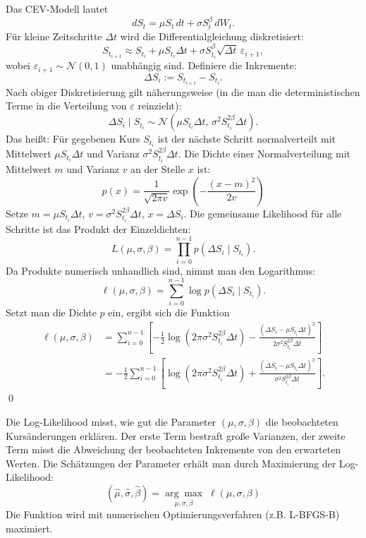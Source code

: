 \begin{satz}
Das CEV-Modell lautet
$$
dS_t = \mu S_t\,dt + \sigma S_t^{\beta}\,dW_t.
$$
Für kleine Zeitschritte $\Delta t$ wird die Differentialgleichung diskretisiert:
$$
S_{t_{i+1}} \approx S_{t_i} + \mu S_{t_i} \Delta t + \sigma S_{t_i}^{\beta} \sqrt{\Delta t}\, \varepsilon_{i+1},
$$
wobei $\varepsilon_{i+1} \sim \mathcal N(0,1)$ unabhängig sind.
Definiere die Inkremente:
$$
\Delta S_i := S_{t_{i+1}} - S_{t_i}.
$$
Nach obiger Diskretisierung gilt näherungsweise (in die man die deterministischen Terme in die Verteilung von $\varepsilon$ reinzieht):
$$
\Delta S_i \mid S_{t_i} \sim \mathcal N\left(\mu S_{t_i} \Delta t,\, \sigma^2 S_{t_i}^{2\beta} \Delta t\right).
$$
Das heißt: Für gegebenen Kurs $S_{t_i}$ ist der nächste Schritt normalverteilt mit 
Mittelwert $\mu S_{t_i} \Delta t$ und Varianz $\sigma^2 S_{t_i}^{2\beta} \Delta t$.
Die Dichte einer Normalverteilung mit Mittelwert $m$ und Varianz $v$ an der Stelle $x$ ist:
$$
p(x) = \frac{1}{\sqrt{2\pi v}} \exp\left(-\frac{(x-m)^2}{2v}\right)
$$
Setze $m = \mu S_{t_i} \Delta t$, $v = \sigma^2 S_{t_i}^{2\beta} \Delta t$, $x = \Delta S_i$.
Die gemeinsame Likelihood für alle Schritte ist das Produkt der Einzeldichten:
$$
L(\mu, \sigma, \beta) = \prod_{i=0}^{n-1} p(\Delta S_i \mid S_{t_i}).
$$
Da Produkte numerisch unhandlich sind, nimmt man den Logarithmus:
$$
\ell(\mu, \sigma, \beta) = \sum_{i=0}^{n-1} \log p(\Delta S_i \mid S_{t_i}).
$$
Setzt man die Dichte $p$ ein, ergibt sich die Funktion
\begin{align*}
\ell(\mu, \sigma, \beta) &= \sum_{i=0}^{n-1} \left[
    -\frac{1}{2} \log(2\pi \sigma^2 S_{t_i}^{2\beta} \Delta t)
    -\frac{(\Delta S_i - \mu S_{t_i} \Delta t)^2}{2 \sigma^2 S_{t_i}^{2\beta} \Delta t}
\right] \\
&= -\frac{1}{2} \sum_{i=0}^{n-1} \left[
    \log(2\pi \sigma^2 S_{t_i}^{2\beta} \Delta t)
    + \frac{(\Delta S_i - \mu S_{t_i} \Delta t)^2}{\sigma^2 S_{t_i}^{2\beta} \Delta t}
\right].
\end{align*} 
\qed
\end{satz}

\begin{bem}[Interpretation]
Die Log-Likelihood misst, wie gut die Parameter $(\mu, \sigma, \beta)$ die beobachteten Kursänderungen erklären. 
Der erste Term bestraft große Varianzen, der zweite Term misst die Abweichung der beobachteten Inkremente von den erwarteten Werten.
Die Schätzungen der Parameter erhält man durch Maximierung der Log-Likelihood:
$$
(\widehat{\mu}, \widehat{\sigma}, \widehat{\beta}) = \underset{\mu, \sigma, \beta}{\arg\max} \; \ell(\mu, \sigma, \beta)
$$
Die Funktion wird mit numerischen Optimierungsverfahren (z.B. L-BFGS-B) maximiert.
\end{bem}

